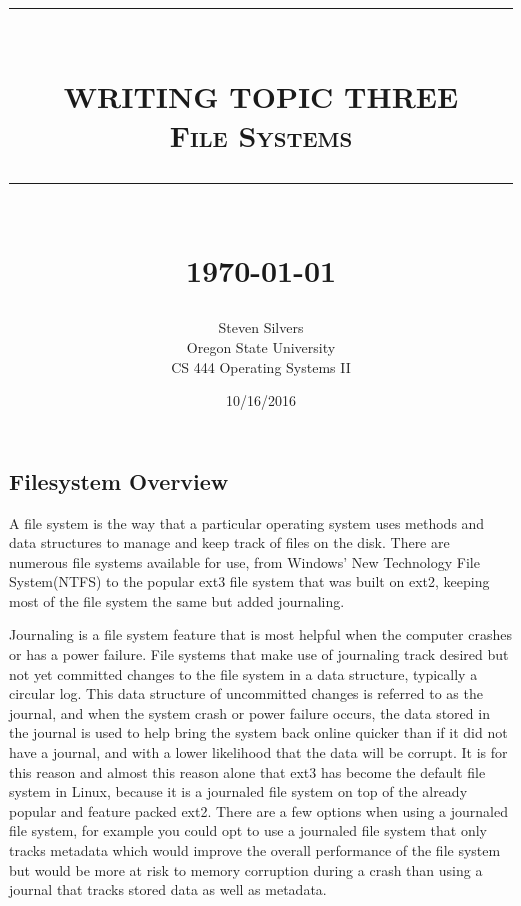 \documentclass[10pt,serif,draftclsnofoot,onecolumn]{IEEEtran}
\newcommand{\HRule}[1]{\rule{\linewidth}{#1}}
\begin{document}
	\begin{titlepage}


	\title{ \normalsize \textsc{}
			\\ [2.0cm]
			\HRule{0.5pt} \\
			\LARGE \textbf{\uppercase{Writing topic three}}
			\\ \normalsize \textsc{File Systems}
			\HRule{2pt} \\ [0.5cm]
			\normalsize \today \vspace*{5\baselineskip}}
	\date{10/16/2016}
	
	\author{Steven Silvers \\
			Oregon State University \\
			CS 444 Operating Systems II}
	\maketitle
	\end{titlepage}
	\newpage
	\subsection{Filesystem Overview}
	\par
			A file system is the way that a particular operating system uses methods and data structures to manage and keep track of files on the disk\cite{14}. There are numerous file systems available for use, from Windows' New Technology File System(NTFS) to the popular ext3 file system that was built on ext2, keeping most of the file system the same but added journaling.
	\newline
	\par
			Journaling is a file system feature that is most helpful when the computer crashes or has a power failure. File systems that make use of journaling track desired but not  yet committed changes to the file system in a data structure, typically a circular log\cite{15}. This data structure of uncommitted changes is referred to as the journal, and when the system crash or power failure occurs, the data stored in the journal is used to help bring the system back online quicker than if it did not have a journal, and with a lower likelihood that the data will be corrupt. It is for this reason and almost this reason alone that ext3 has become the default file system in Linux, because it is a journaled file system on top of the already popular and feature packed ext2\cite{14}. There are a few options when using a journaled file system, for example you could opt to use a journaled file system that only tracks metadata which would improve the overall performance of the file system but would be more at risk to memory corruption during a crash than using a journal that tracks stored data as well as metadata.
	\newline
\end{document}

